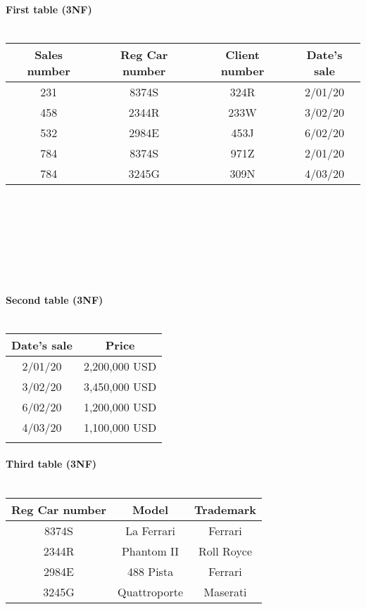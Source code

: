 \documentclass{article}
\begin{document}
\paragraph{First table (3NF)\\\\}
\begin{tabular}{|c|c|c|c|}
Sales number & Reg Car number & Client number & Date's sale\\
\hline
231 & 8374S & 324R & 2/01/20\\
458 & 2344R  & 233W & 3/02/20\\
532 & 2984E & 453J & 6/02/20\\
784 & 8374S & 971Z & 2/01/20\\
784 & 3245G & 309N & 4/03/20\\
\end{tabular}\\\\\\\\\\\
\paragraph{Second table (3NF)\\\\}
\begin{tabular}{|c|c|}
Date's sale & Price\\
\hline
2/01/20 & 2,200,000 USD\\
3/02/20 & 3,450,000 USD\\
6/02/20 & 1,200,000 USD\\
4/03/20 & 1,100,000 USD\\\\
\end{tabular}
\paragraph{Third table (3NF)\\\\}
\begin{tabular}{|c|c|c|}
Reg Car number & Model & Trademark\\
\hline
8374S & La Ferrari & Ferrari\\
2344R & Phantom II & Roll Royce\\
2984E & 488 Pista & Ferrari\\
3245G & Quattroporte & Maserati\\
\end{tabular}
\end{document}
